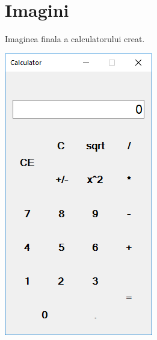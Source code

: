 \section{Imagini}
Imaginea finala a calculatorului creat.
\begin{center}
\includegraphics[scale=1]{images/1}
\end{center}
\clearpage